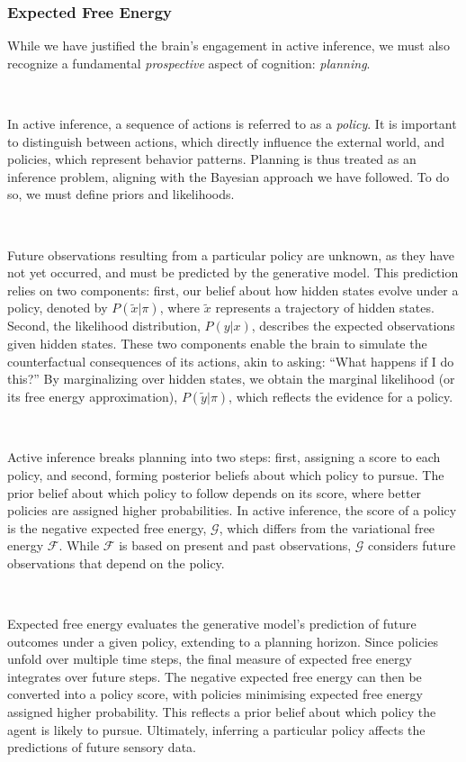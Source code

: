 \documentclass{article}
\begin{document}
\subsubsection{Expected Free Energy}

While we have justified the brain's engagement in active inference, we must also recognize a fundamental \textit{prospective} aspect of cognition: \textit{planning}.

\

In active inference, a sequence of actions is referred to as a \textit{policy}. It is important to distinguish between actions, which directly influence the external world, and policies, which represent behavior patterns. Planning is thus treated as an inference problem, aligning with the Bayesian approach we have followed. To do so, we must define priors and likelihoods.

\

Future observations resulting from a particular policy are unknown, as they have not yet occurred, and must be predicted by the generative model. This prediction relies on two components: first, our belief about how hidden states evolve under a policy, denoted by $P(\tilde{x} | \pi)$, where $\tilde{x}$ represents a trajectory of hidden states. Second, the likelihood distribution, $P(y | x)$, describes the expected observations given hidden states. These two components enable the brain to simulate the counterfactual consequences of its actions, akin to asking: “What happens if I do this?” By marginalizing over hidden states, we obtain the marginal likelihood (or its free energy approximation), $P(\tilde{y} | \pi)$, which reflects the evidence for a policy.

\

Active inference breaks planning into two steps: first, assigning a score to each policy, and second, forming posterior beliefs about which policy to pursue. The prior belief about which policy to follow depends on its score, where better policies are assigned higher probabilities. In active inference, the score of a policy is the negative expected free energy, $\mathcal{G}$, which differs from the variational free energy $\mathcal{F}$. While $\mathcal{F}$ is based on present and past observations, $\mathcal{G}$ considers future observations that depend on the policy.

\

Expected free energy evaluates the generative model’s prediction of future outcomes under a given policy, extending to a planning horizon. Since policies unfold over multiple time steps, the final measure of expected free energy integrates over future steps. The negative expected free energy can then be converted into a policy score, with policies minimising expected free energy assigned higher probability. This reflects a prior belief about which policy the agent is likely to pursue. Ultimately, inferring a particular policy affects the predictions of future sensory data.
\end{document}
